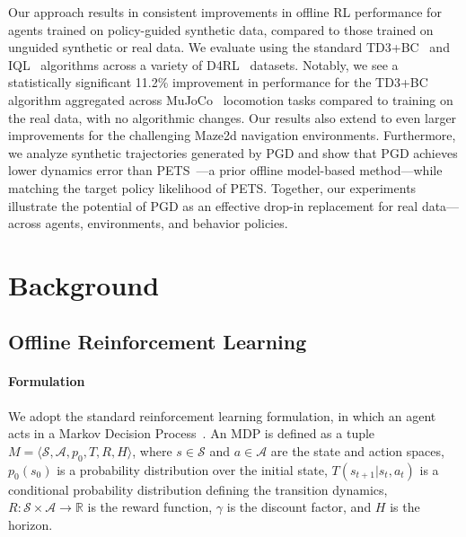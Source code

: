 \documentclass[10pt]{article} %
\theoremstyle{plain}
\theoremstyle{definition}
\theoremstyle{remark}
\begin{document}
Our approach results in consistent improvements in offline RL performance for agents trained on policy-guided synthetic data, compared to those trained on unguided synthetic or real data.
We evaluate using the standard TD3+BC~\citep{fujimoto2021minimalist} and IQL~\citep{kostrikov2021offline} algorithms across a variety of D4RL~\citep{fu2020d4rl} datasets.
Notably, we see a statistically significant 11.2\%  improvement in performance for the TD3+BC algorithm aggregated across MuJoCo~\citep{mujoco} locomotion tasks compared to training on the real data, with no algorithmic changes.
Our results also extend to even larger improvements for the challenging Maze2d navigation environments.
Furthermore, we analyze synthetic trajectories generated by PGD and show that PGD achieves lower dynamics error than PETS~\citep{chua2018deep}---a prior offline model-based method---while matching the target policy likelihood of PETS.
Together, our experiments illustrate the potential of PGD as an effective drop-in replacement for real data---across agents, environments, and behavior policies.





\section{Background}
\label{background}

\subsection{Offline Reinforcement Learning}
\label{sec:offline_rl}
\paragraph{Formulation}
We adopt the standard reinforcement learning formulation, in which an agent acts in a Markov Decision Process~\citep[MDP,][]{Sutton1998}. An MDP is defined as a tuple $M = \langle \mathcal{S}, \mathcal{A}, p_0, T, R, H \rangle$, where $s\in\mathcal{S}$ and $a\in\mathcal{A}$ are the state and action spaces, $p_0(s_0)$ is a probability distribution over the initial state, $T(s_{t+1}|s_t,a_t)$ is a conditional probability distribution defining the transition dynamics, $R: \mathcal{S} \times \mathcal{A} \xrightarrow{} \mathbb{R}$ is the reward function, $\gamma$ is the discount factor, and $H$ is the horizon.
\end{document}
